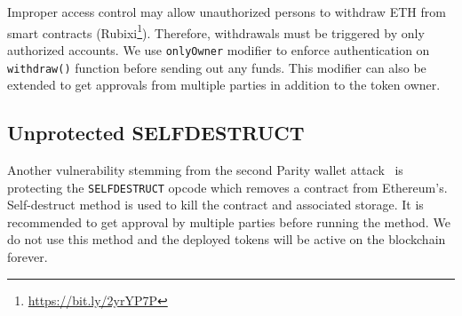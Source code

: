 Improper access control may allow unauthorized persons to withdraw ETH from smart contracts (\cf Rubixi\footnote{\url{https://bit.ly/2yrYP7P}}). Therefore, withdrawals must be triggered by only authorized accounts. We use \texttt{onlyOwner} modifier to enforce authentication on \texttt{withdraw()} function before sending out any funds. {\chg This modifier can also be extended to get approvals from multiple parties in addition to the token owner.}

\subsection{Unprotected SELFDESTRUCT}

Another vulnerability stemming from the second Parity wallet attack~\cite{ParitySecondHack} is protecting the \texttt{SELFDESTRUCT} opcode which removes a contract from Ethereum's. Self-destruct method is used to kill the contract and associated storage. It is recommended to get approval by multiple parties before running the method. We do not use this method and the deployed \erc tokens will be active on the blockchain forever.

